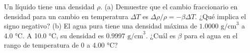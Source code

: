 \item Un líquido tiene una densidad $\rho$. (a) Demuestre que el cambio fraccionario en densidad para un cambio en temperatura $\Delta T$ es $\Delta \rho / \rho = -\beta \Delta T$. ¿Qué implica el signo negativo? (b) El agua pura tiene una densidad máxima de $1.0000\text{ g/cm}^3$ a 4.0 °C. A 10.0 °C, su densidad es $0.9997\text{ g/cm}^3$. ¿Cuál es $\beta$ para el agua en el rango de temperatura de 0 a 4.00 °C?
